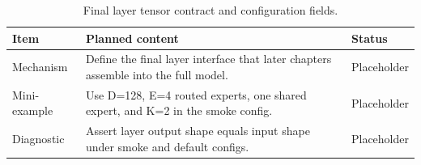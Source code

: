 \begin{table}[H]
\centering
\caption{Final layer tensor contract and configuration fields.}
\label{tab:ch08-the-minideepseekmoe-layer-contract}
\begin{tabularx}{\textwidth}{p{}X p{}}
\toprule
Item & Planned content & Status \\
\midrule
Mechanism & Define the final layer interface that later chapters assemble into the full model. & Placeholder \\
Mini-example & Use D=128, E=4 routed experts, one shared expert, and K=2 in the smoke config. & Placeholder \\
Diagnostic & Assert layer output shape equals input shape under smoke and default configs. & Placeholder \\
\bottomrule
\end{tabularx}
\end{table}
